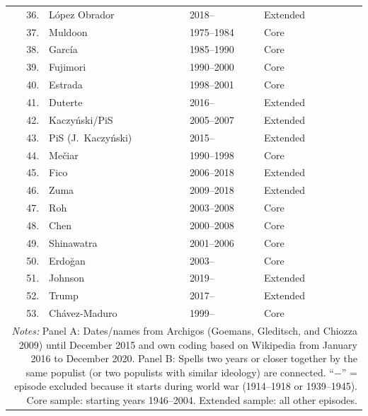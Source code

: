 {\begin{longtable}{rp{2.2cm}p{2.4cm}p{3.2cm}l}
36. & L\'opez Obrador & 2018-- & Extended & \\
37. & Muldoon & 1975--1984 & Core & \\
38. & Garc\'ia & 1985--1990 & Core & \\
39. & Fujimori & 1990--2000 & Core & \\
40. & Estrada & 1998--2001 & Core & \\
41. & Duterte & 2016-- & Extended & \\
42. & Kaczy\'nski/PiS & 2005--2007 & Extended & \\
43. & PiS (J.\ Kaczy\'nski) & 2015-- & Extended & \\
44. & Me\v{c}iar & 1990--1998 & Core & \\
45. & Fico & 2006--2018 & Extended & \\
46. & Zuma & 2009--2018 & Extended & \\
47. & Roh & 2003--2008 & Core & \\
48. & Chen & 2000--2008 & Core & \\
49. & Shinawatra & 2001--2006 & Core & \\
50. & Erdo\u{g}an & 2003-- & Core & \\
51. & Johnson & 2019-- & Extended & \\
52. & Trump & 2017-- & Extended & \\
53. & Ch\'avez-Maduro & 1999-- & Core & \\
\hline\hline
\multicolumn{5}{p{14cm}}{\textit{Notes:} Panel A: Dates/names from Archigos (Goemans, Gleditsch, and Chiozza 2009) until December 2015 and own coding based on Wikipedia from January 2016 to December 2020. Panel B: Spells two years or closer together by the same populist (or two populists with similar ideology) are connected. ``$-$'' = episode excluded because it starts during world war (1914--1918 or 1939--1945). Core sample: starting years 1946--2004. Extended sample: all other episodes.} \\
\end{longtable}
}
